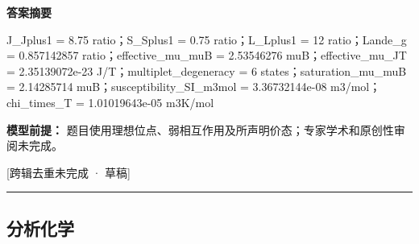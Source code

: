 \documentclass[UTF8,11pt,a4paper]{ctexart}
\begin{document}
\noindent\textbf{答案摘要}\par
J\_Jplus1 = 8.75 ratio；S\_Splus1 = 0.75 ratio；L\_Lplus1 = 12 ratio；Lande\_g = 0.857142857 ratio；effective\_mu\_muB = 2.53546276 muB；effective\_mu\_JT = 2.35139072e-23 J/T；multiplet\_degeneracy = 6 states；saturation\_mu\_muB = 2.14285714 muB；susceptibility\_SI\_m3mol = 3.36732144e-08 m3/mol；chi\_times\_T = 1.01019643e-05 m3K/mol\par
\noindent\textbf{模型前提：}
题目使用理想位点、弱相互作用及所声明价态；专家学术和原创性审阅未完成。\par
\noindent\textcolor{red!65!black}{[跨辑去重未完成 · 草稿]} \par
\medskip\hrule\medskip
\subsection*{分析化学}
\end{document}
